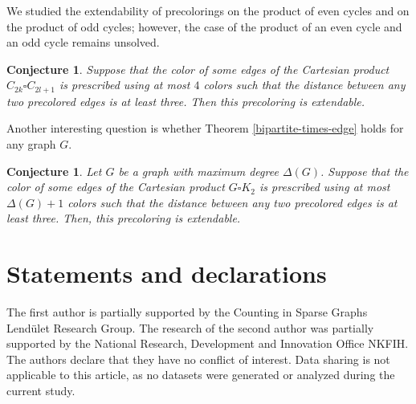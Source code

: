 \documentclass[a4paper,12pt]{article}
\newtheorem{conjecture}[theorem]{\bf Conjecture}
\begin{document}
We studied the extendability of precolorings on the product of even cycles and on the product of odd cycles; however, the case of the product of an even cycle and an odd cycle remains unsolved.

\sloppy
\begin{conjecture}
    Suppose that the color of some edges of the Cartesian product $C_{2k} \square C_{2l+1}$ is prescribed using at most $4$ colors such that the distance between any two precolored edges is at least three. Then this precoloring is extendable.
\end{conjecture}
\fussy

\noindent
Another interesting question is whether Theorem \ref{bipartite-times-edge} holds for any graph $G$.

\begin{conjecture}
    Let $G$ be a graph with maximum degree $\Delta(G)$. Suppose that the color of some edges of the Cartesian product $G \square K_{2}$ is prescribed using at most $\Delta(G)+1$ colors such that the distance between any two precolored edges is at least three. Then, this precoloring is extendable.
\end{conjecture}





\section*{Statements and declarations}
The first author is partially supported by the Counting in Sparse Graphs Lendület Research Group.
The research of the second author was partially supported by the National Research, Development and Innovation Office NKFIH. 
The authors declare that they have no conflict of interest.
Data sharing is not applicable to this article, as no datasets were generated or analyzed during the current study.
\end{document}

